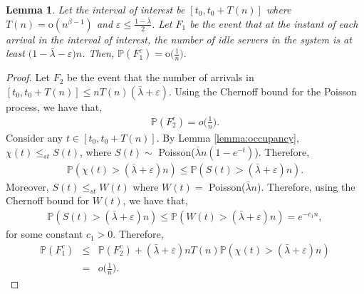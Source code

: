 \documentclass[10pt, conference, letterpaper]{IEEEtran}
\newtheorem{lemma}{Lemma}
\def \oo {\mathrm{o}}
\begin{document}
\begin{lemma}
	\label{lemma:F_1}
	Let the interval of interest be $[t_0, t_0 + T(n)]$ where $T(n) = \oo(n^{\beta-1})$ and $\varepsilon \leq \frac{1-\bar{\lambda}}{2}$. Let $F_1$ be the event that at the instant of each arrival in the interval of interest, the number of idle servers in the system is at least $\big(1-\bar{\lambda}-\varepsilon \big) n$. Then,
	$
	\mathbb{P}(F_1^c) = \oo\big(\frac{1}{n}\big).
	$
\end{lemma}
\begin{proof}
	Let $F_2$ be the event that the number of arrivals in $[t_0, t_0 + T(n)] \leq nT(n)(\bar{\lambda}+\varepsilon)$. Using the Chernoff bound for the  Poisson process, we have that, \begin{eqnarray*}
		\mathbb{P}(F_2^c) = o\bigg(\frac{1}{n}\bigg).
	\end{eqnarray*}
	Consider any $t \in [t_0, t_0 + T(n)]$. By Lemma \ref{lemma:occupancy}, $\chi(t) \leq_{st} S(t) $, where $S(t) \sim$ Poisson($\bar{\lambda} n (1-e^{-t})$). Therefore,
	\begin{eqnarray*}
		\mathbb{P}(\chi(t)>(\bar{\lambda}+\varepsilon)n) \leq \mathbb{P}(S(t)>(\bar{\lambda}+\varepsilon)n).
	\end{eqnarray*}
	Moreover, $S(t) \leq_{st} W(t)$ where $W(t) =$ Poisson($\bar{\lambda} n$). Therefore, using the Chernoff bound for $W(t)$, we have that,
	\begin{eqnarray*}
		\mathbb{P}(S(t)>(\bar{\lambda}+\varepsilon)n) \leq \mathbb{P}(W(t)>(\bar{\lambda}+\varepsilon)n) = e^{-c_1n},
	\end{eqnarray*}
	for some constant $c_1 > 0$. Therefore,
	\begin{eqnarray*}
		\mathbb{P}(F_1^c) &\leq& \mathbb{P}(F_2^c) + (\bar{\lambda}+\varepsilon)nT(n) \mathbb{P}(\chi(t)>(\bar{\lambda}+\varepsilon)n)\\
		&=& o\bigg(\frac{1}{n}\bigg).
	\end{eqnarray*}
\end{proof}
\end{document}
